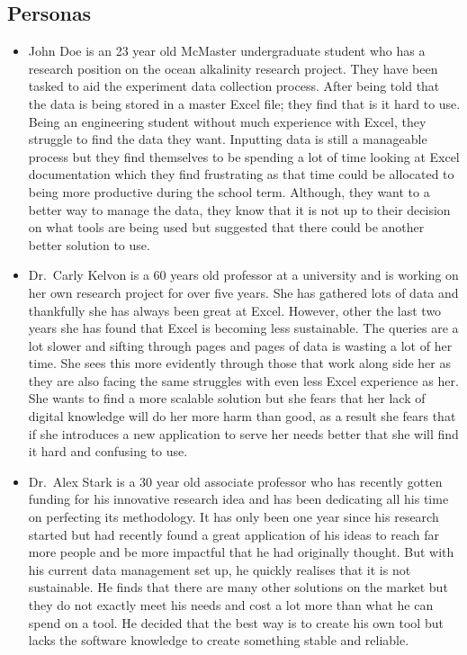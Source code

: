 \documentclass[12pt]{article}
\begin{document}
\subsection{Personas}
\label{personas}
\begin{itemize}
  \item John Doe is an 23 year old McMaster undergraduate student who has a
  research position on the ocean alkalinity research project. They have been
  tasked to aid the experiment data collection process. After being told that
  the data is being stored in a master Excel file; they find that is it hard to
  use. Being an engineering student without much experience with Excel, they
  struggle to find the data they want. Inputting data is still a manageable
  process but they find themselves to be spending a lot of time looking at Excel
  documentation which they find frustrating as that time could be allocated to
  being more productive during the school term. Although, they want to a better
  way to manage the data, they know that it is not up to their decision on what
  tools are being used but suggested that there could be another better solution
  to use. 
  \item Dr.\ Carly Kelvon is a 60 years old professor at a university and
  is working on her own research project for over five years. She has gathered
  lots of data and thankfully she has always been great at Excel. However, other
  the last two years she has found that Excel is becoming less sustainable. The
  queries are a lot slower and sifting through pages and pages of data is
  wasting a lot of her time. She sees this more evidently through those that
  work along side her as they are also facing the same struggles with even less
  Excel experience as her. She wants to find a more scalable solution but she
  fears that her lack of digital knowledge will do her more harm than good, as a
  result she fears that if she introduces a new application to serve her needs
  better that she will find it hard and confusing to use. 
  \item Dr.\ Alex Stark is a 30 year old associate professor who has recently
  gotten funding for his innovative research idea and has been dedicating all
  his time on perfecting its methodology. It has only been one year since his
  research started but had recently found a great application of his ideas to
  reach far more people and be more impactful that he had originally thought.
  But with his current data management set up, he quickly realises that it is not
  sustainable. He finds that there are many other solutions on the market but
  they do not exactly meet his needs and cost a lot more than what he can spend
  on a tool. He decided that the best way is to create his own tool but lacks
  the software knowledge to create something stable and reliable. 
\end{itemize}
    
\end{document}
